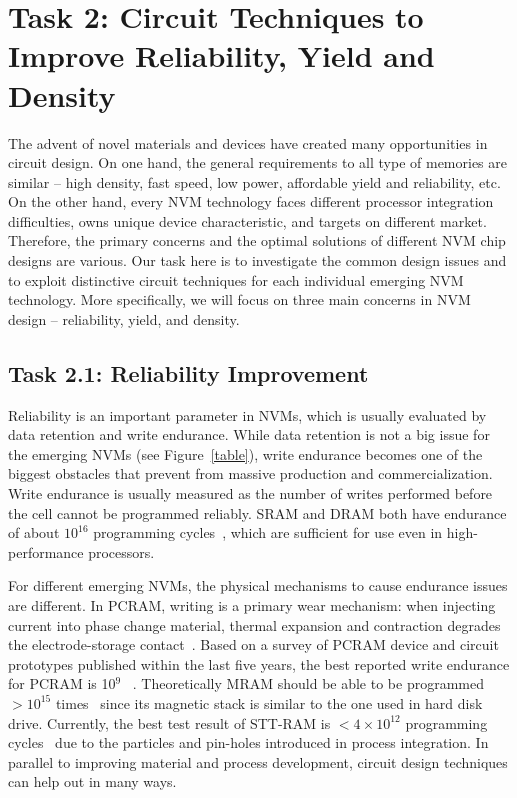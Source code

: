 
\section{Task 2: Circuit Techniques to Improve Reliability, Yield and Density}
The advent of novel materials and devices have created many opportunities in circuit design. On one hand, the general requirements to all type of memories are similar -- high density, fast speed, low power, affordable yield and reliability, etc. On the other hand, every NVM technology faces different processor integration difficulties,  owns unique device characteristic, and targets on different market. Therefore, the primary concerns and the optimal solutions of different NVM chip designs are various. Our task here is to investigate the common design issues and to exploit distinctive circuit techniques for each individual emerging NVM technology. More specifically, we will focus on three main concerns in NVM design -- reliability, yield, and density.

\subsection{Task 2.1: Reliability Improvement}
Reliability is an important parameter in NVMs, which is usually evaluated by data retention and write endurance. While data retention is not a big issue for the emerging NVMs (see Figure~\ref{table}), write endurance becomes one of the biggest obstacles that prevent from massive production and commercialization. Write endurance is usually measured as the number of writes performed before the cell cannot be programmed reliably. SRAM and DRAM both have endurance of about $10^{16}$ programming cycles~\cite{ITRS07}, which are sufficient for use even in high-performance processors.

For different emerging NVMs, the physical mechanisms to cause endurance issues are different. In PCRAM, writing is a primary wear mechanism: when injecting current into phase change material, thermal expansion and contraction degrades the electrode-storage contact~\cite{Lee09}. Based on a survey of PCRAM device and circuit prototypes published within the last five years, the best reported write endurance for PCRAM is 10$^9$ ~\cite{Lee09}. Theoretically MRAM should be able to be programmed $>10^{15}$ times~\cite{ITRS07} since its magnetic stack is similar to the one used in hard disk drive. Currently, the best test result of STT-RAM is $<4\times10^{12}$ programming cycles~\cite{Diao07} due to the particles and pin-holes introduced in process integration. In parallel to improving material and process development, circuit design techniques can help out in many ways.

